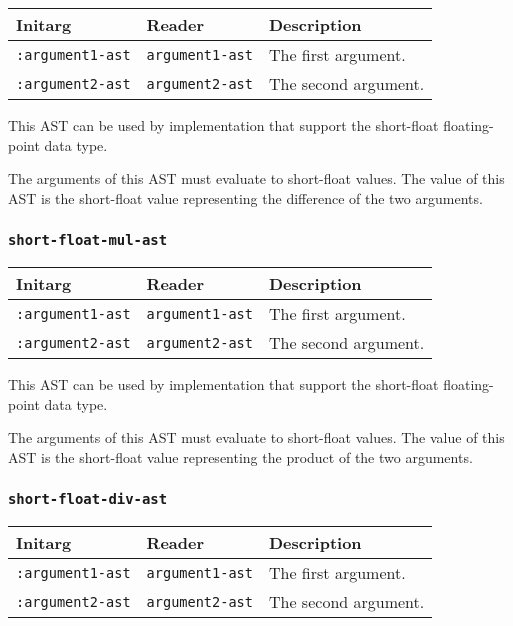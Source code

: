 \begin{tabular}{|l|l|l|}
\hline
Initarg & Reader & Description\\
\hline\hline
\texttt{:argument1-ast} & \texttt{argument1-ast} & The first argument.\\
\hline
\texttt{:argument2-ast} & \texttt{argument2-ast} & The second argument.\\
\hline
\end{tabular}

This AST can be used by implementation that support the short-float
floating-point data type.  

The arguments of this AST must evaluate to short-float
values.  The value of this AST is the short-float value
representing the difference of the two arguments.

\subsubsection{\texttt{short-float-mul-ast}}
\label{sec-ast-short-float-mul}

\begin{tabular}{|l|l|l|}
\hline
Initarg & Reader & Description\\
\hline\hline
\texttt{:argument1-ast} & \texttt{argument1-ast} & The first argument.\\
\hline
\texttt{:argument2-ast} & \texttt{argument2-ast} & The second argument.\\
\hline
\end{tabular}

This AST can be used by implementation that support the short-float
floating-point data type.  

The arguments of this AST must evaluate to short-float
values.  The value of this AST is the short-float value
representing the product of the two arguments.

\subsubsection{\texttt{short-float-div-ast}}
\label{sec-ast-short-float-div}

\begin{tabular}{|l|l|l|}
\hline
Initarg & Reader & Description\\
\hline\hline
\texttt{:argument1-ast} & \texttt{argument1-ast} & The first argument.\\
\hline
\texttt{:argument2-ast} & \texttt{argument2-ast} & The second argument.\\
\hline
\end{tabular}


